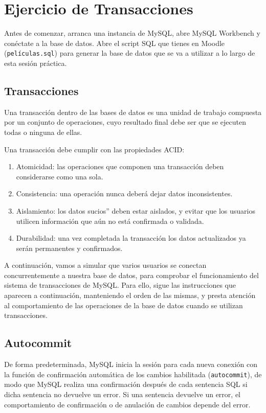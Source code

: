 \documentclass[a4paper]{article}
\begin{document}
\section*{Ejercicio de Transacciones}

Antes de comenzar, arranca una instancia de MySQL, abre MySQL Workbench y conéctate a la base de datos. Abre el script SQL que tienes en Moodle (\texttt{películas.sql}) para generar la base de datos que se va a utilizar a lo largo de esta sesión práctica.

\subsection*{Transacciones}

Una transacción dentro de las bases de datos es una unidad de trabajo compuesta por un conjunto de operaciones, cuyo resultado final debe ser que se ejecuten todas o ninguna de ellas.

Una transacción debe cumplir con las propiedades ACID:

\begin{enumerate}
    \item Atomicidad: las operaciones que componen una transacción deben considerarse como una sola.
    \item Consistencia: una operación nunca deberá dejar datos inconsistentes.
    \item Aislamiento: los datos sucios'' deben estar aislados, y evitar que los usuarios utilicen información que aún no está confirmada o validada.
    \item Durabilidad: una vez completada la transacción los datos actualizados ya serán permanentes y confirmados.
\end{enumerate}

A continuación, vamos a simular que varios usuarios se conectan concurrentemente a nuestra base de datos, para comprobar el funcionamiento del sistema de transacciones de MySQL. Para ello, sigue las instrucciones que aparecen a continuación, manteniendo el orden de las mismas, y presta atención al comportamiento de las operaciones de la base de datos cuando se utilizan transacciones.

\subsection*{Autocommit}

De forma predeterminada, MySQL inicia la sesión para cada nueva conexión con la función de confirmación automática de los cambios habilitada (\texttt{autocommit}), de modo que MySQL realiza una confirmación después de cada sentencia SQL si dicha sentencia no devuelve un error. Si una sentencia devuelve un error, el comportamiento de confirmación o de anulación de cambios depende del error.
\end{document}
